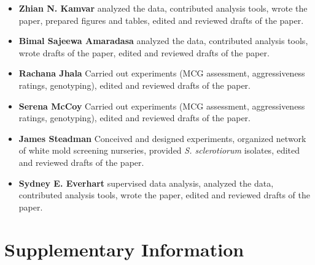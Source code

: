 \documentclass[fleqn,10pt,lineno]{wlpeerj} %
\theoremstyle{definition}
\theoremstyle{definition}
\theoremstyle{definition}
\theoremstyle{remark}
\begin{document}
\begin{itemize}
\item
  \textbf{Zhian N. Kamvar} analyzed the data, contributed analysis
  tools, wrote the paper, prepared figures and tables, edited and
  reviewed drafts of the paper.
\item
  \textbf{Bimal Sajeewa Amaradasa} analyzed the data, contributed
  analysis tools, wrote drafts of the paper, edited and reviewed drafts
  of the paper.
\item
  \textbf{Rachana Jhala} Carried out experiments (MCG assessment,
  aggressiveness ratings, genotyping), edited and reviewed drafts of the
  paper.
\item
  \textbf{Serena McCoy} Carried out experiments (MCG assessment,
  aggressiveness ratings, genotyping), edited and reviewed drafts of the
  paper.
\item
  \textbf{James Steadman} Conceived and designed experiments, organized
  network of white mold screening nurseries, provided \emph{S.
  sclerotiorum} isolates, edited and reviewed drafts of the paper.
\item
  \textbf{Sydney E. Everhart} supervised data analysis, analyzed the
  data, contributed analysis tools, wrote the paper, edited and reviewed
  drafts of the paper.
\end{itemize}

\newpage

\section*{Supplementary Information}\label{supplementary-information}

\setcounter{table}{0} \renewcommand{\thetable}{S\arabic{table}}
\setcounter{figure}{0} \renewcommand{\thefigure}{S\arabic{figure}}
\end{document}
